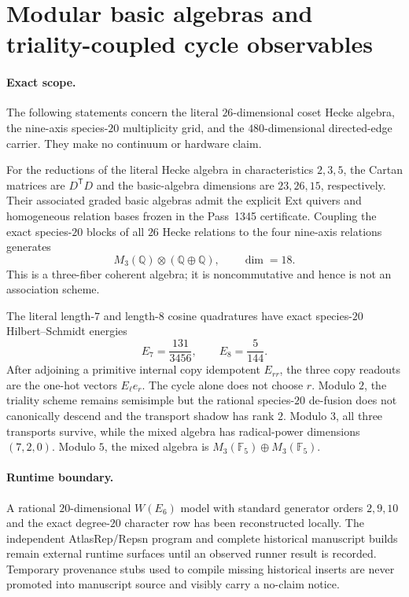 \section{Modular basic algebras and triality-coupled cycle observables}
\label{sec:pass1345-1349}

\paragraph{Exact scope.}
The following statements concern the literal $26$-dimensional coset Hecke algebra,
the nine-axis species-$20$ multiplicity grid, and the $480$-dimensional directed-edge
carrier.  They make no continuum or hardware claim.

\begin{theorem}
For the reductions of the literal Hecke algebra in characteristics $2,3,5$, the
Cartan matrices are $D^{\mathsf T}D$ and the basic-algebra dimensions are
$23,26,15$, respectively.  Their associated graded basic algebras admit the
explicit Ext quivers and homogeneous relation bases frozen in the Pass~1345
certificate.  Coupling the exact species-$20$ blocks of all $26$ Hecke relations
to the four nine-axis relations generates
\[
 M_3(\mathbb Q)\otimes(\mathbb Q\oplus\mathbb Q),\qquad \dim=18.
\]
This is a three-fiber coherent algebra; it is noncommutative and hence is not an
association scheme.
\end{theorem}

\begin{theorem}
The literal length-$7$ and length-$8$ cosine quadratures have exact species-$20$
Hilbert--Schmidt energies
\[
 E_7=\frac{131}{3456},\qquad E_8=\frac{5}{144}.
\]
After adjoining a primitive internal copy idempotent $E_{rr}$, the three copy
readouts are the one-hot vectors $E_\ell e_r$.  The cycle alone does not choose
$r$.  Modulo $2$, the triality scheme remains semisimple but the rational
species-$20$ de-fusion does not canonically descend and the transport shadow has
rank $2$.  Modulo $3$, all three transports survive, while the mixed algebra has
radical-power dimensions $(7,2,0)$.  Modulo $5$, the mixed algebra is
$M_3(\mathbb F_5)\oplus M_3(\mathbb F_5)$.
\end{theorem}

\paragraph{Runtime boundary.}
A rational $20$-dimensional $W(E_6)$ model with standard generator orders
$2,9,10$ and the exact degree-$20$ character row has been reconstructed locally.
The independent AtlasRep/Repsn program and complete historical manuscript builds
remain external runtime surfaces until an observed runner result is recorded.
Temporary provenance stubs used to compile missing historical inserts are never
promoted into manuscript source and visibly carry a no-claim notice.
